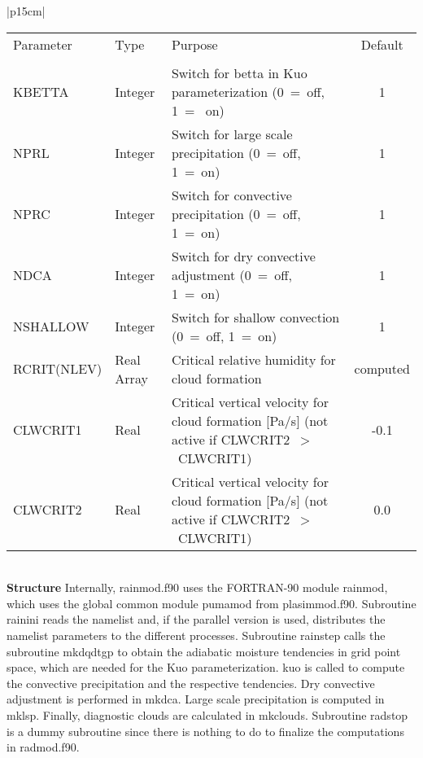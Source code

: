 \begin{center}
\begin{tabular}{|p{15cm}|}
\begin{center}
\begin{tabular}{l l p{5cm} c}  %
Parameter & Type & Purpose & Default \\
&&&\\
KBETTA & Integer & Switch for betta in Kuo parameterization (0~=~off, 1~=~ on) & 1 \\
NPRL & Integer &Switch for large scale precipitation (0~=~off, 1~=~on) & 1 \\
NPRC & Integer &Switch for convective  precipitation (0~=~off, 1~=~on) & 1 \\
NDCA & Integer &Switch for dry convective adjustment (0~=~off, 1~=~on) & 1 \\
NSHALLOW & Integer &Switch for shallow convection (0~=~off, 1~=~on) & 1 \\
RCRIT(NLEV) & Real Array & Critical relative humidity for cloud formation & computed \\
CLWCRIT1 & Real & Critical vertical velocity for cloud formation [Pa/s] (not active if
CLWCRIT2~$>$~CLWCRIT1) & -0.1 \\
CLWCRIT2 & Real & Critical vertical velocity for cloud formation [Pa/s] (not active if
CLWCRIT2~$>$~CLWCRIT1) & 0.0
\end{tabular} 
\end{center}
\vspace{3mm} \\
\hline
\vspace{2mm} {\bf Structure} Internally, {\module rainmod.f90} uses the FORTRAN-90
module {\modu rainmod}, which uses the global common module {\modu pumamod} from
{\module plasimmod.f90}. Subroutine {\sub rainini} reads the namelist and, if the parallel
version is used,  distributes the namelist parameters to the different processes. Subroutine
{\sub
rainstep} calls the subroutine {\sub mkdqdtgp} to obtain the adiabatic moisture tendencies in
grid point space, which are needed for the Kuo parameterization. {\sub kuo} is called to
compute the convective precipitation and the respective tendencies. Dry convective
adjustment
is performed in {\sub mkdca}. Large scale precipitation is computed in {\sub mklsp}. Finally,
diagnostic clouds are calculated in {\sub mkclouds}. Subroutine {\sub radstop} is a
dummy subroutine since there is nothing to do to finalize the computations in {\module
radmod.f90}. \vspace{3mm} \\
\hline
\end{tabular}
\end{center}
\newpage

